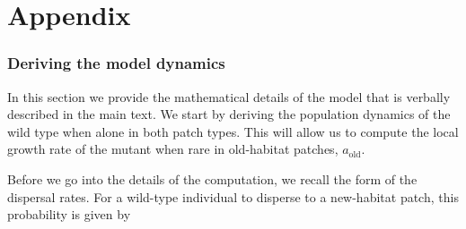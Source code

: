 \documentclass[11pt]{article}
\newcommand{\chg}[1]{\textcolor{change}{#1}}
\begin{document}
\clearpage


\renewcommand*{\thepage}{S\arabic{page}}

\renewcommand\theequation{S\arabic{equation}}
\renewcommand\thesection{S\arabic{section}}
\renewcommand\thefigure{S\arabic{figure}}

\resetlinenumber
\renewcommand\thelinenumber{S\arabic{linenumber}}
\linenumbers{}
\modulolinenumbers[2]

\appendix 


\part{Appendix} %
\parttoc %





\clearpage

\renewcommand{\theequation}{A\arabic{equation}}
\setcounter{equation}{0}  %
\renewcommand{\thetable}{A\arabic{table}}
\setcounter{figure}{0}
\setcounter{table}{0}

\section{Deriving the model dynamics \label{sec:app:modeldyn}}
In this section we provide the mathematical \chg{details} of the model that is verbally described in the main text. We start by deriving the population dynamics of the wild type \chg{when alone} in both patch types. This will allow us to compute the local growth rate of the mutant \chg{when rare} in old-habitat patches, $a_{\text{old}}$.  

Before we go into the details of the computation, we recall the form of the dispersal rates. For a wild-type individual to disperse to a new-habitat patch, this probability is given by
\end{document}
